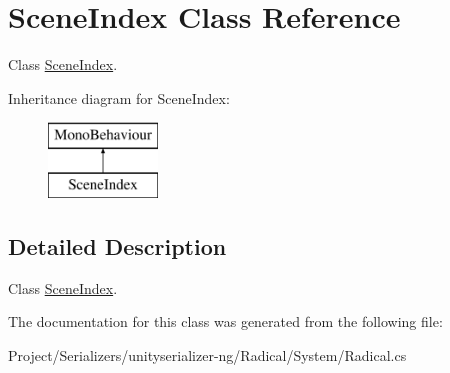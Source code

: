 \hypertarget{class_scene_index}{}\section{Scene\+Index Class Reference}
\label{class_scene_index}


Class \hyperlink{class_scene_index}{Scene\+Index}.  


Inheritance diagram for Scene\+Index\+:\begin{figure}[H]
\begin{center}
\leavevmode
\includegraphics[height=2.000000cm]{class_scene_index}
\end{center}
\end{figure}


\subsection{Detailed Description}
Class \hyperlink{class_scene_index}{Scene\+Index}. 



The documentation for this class was generated from the following file\+:\begin{DoxyCompactItemize}
\item 
Project/\+Serializers/unityserializer-\/ng/\+Radical/\+System/Radical.\+cs\end{DoxyCompactItemize}
